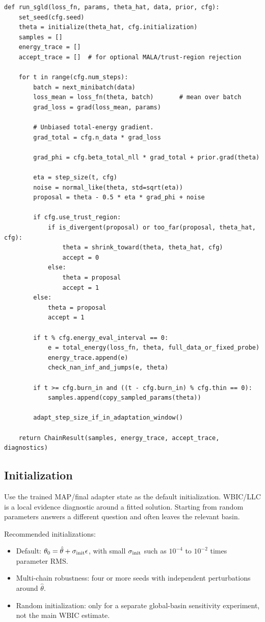 \documentclass[11pt]{article}
\begin{document}
\begin{verbatim}
def run_sgld(loss_fn, params, theta_hat, data, prior, cfg):
    set_seed(cfg.seed)
    theta = initialize(theta_hat, cfg.initialization)
    samples = []
    energy_trace = []
    accept_trace = []  # for optional MALA/trust-region rejection

    for t in range(cfg.num_steps):
        batch = next_minibatch(data)
        loss_mean = loss_fn(theta, batch)       # mean over batch
        grad_loss = grad(loss_mean, params)

        # Unbiased total-energy gradient.
        grad_total = cfg.n_data * grad_loss

        grad_phi = cfg.beta_total_nll * grad_total + prior.grad(theta)

        eta = step_size(t, cfg)
        noise = normal_like(theta, std=sqrt(eta))
        proposal = theta - 0.5 * eta * grad_phi + noise

        if cfg.use_trust_region:
            if is_divergent(proposal) or too_far(proposal, theta_hat, cfg):
                theta = shrink_toward(theta, theta_hat, cfg)
                accept = 0
            else:
                theta = proposal
                accept = 1
        else:
            theta = proposal
            accept = 1

        if t % cfg.energy_eval_interval == 0:
            e = total_energy(loss_fn, theta, full_data_or_fixed_probe)
            energy_trace.append(e)
            check_nan_inf_and_jumps(e, theta)

        if t >= cfg.burn_in and ((t - cfg.burn_in) % cfg.thin == 0):
            samples.append(copy_sampled_params(theta))

        adapt_step_size_if_in_adaptation_window()

    return ChainResult(samples, energy_trace, accept_trace, diagnostics)
\end{verbatim}

\subsection{Initialization}

Use the trained MAP/final adapter state as the default initialization.  WBIC/LLC is a local evidence diagnostic around a fitted solution.  Starting from random parameters answers a different question and often leaves the relevant basin.

Recommended initializations:
\begin{itemize}
\item Default: $\theta_0 = \hat\theta + \sigma_{\rm init}\epsilon$, with small $\sigma_{\rm init}$ such as $10^{-4}$ to $10^{-2}$ times parameter RMS.
\item Multi-chain robustness: four or more seeds with independent perturbations around $\hat\theta$.
\item Random initialization: only for a separate global-basin sensitivity experiment, not the main WBIC estimate.
\end{itemize}
\end{document}
